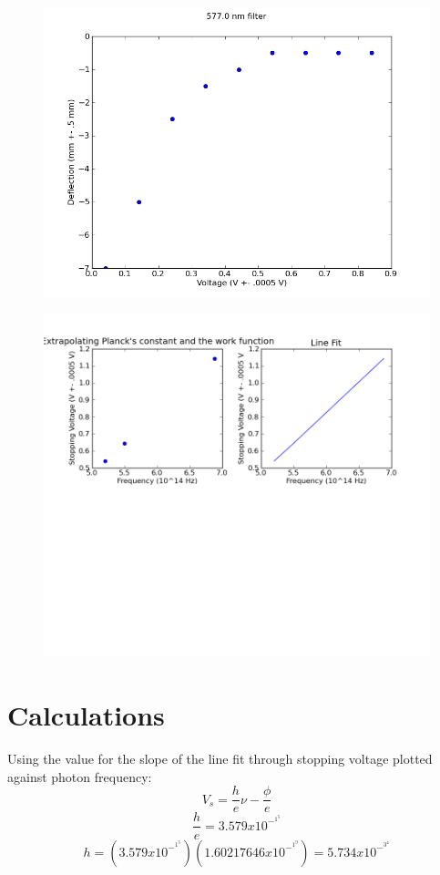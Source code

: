 \documentclass[12pt]{article}
\begin{document}
\begin{figure}[H]
\centering
\hspace{-0.0in}\includegraphics[scale=0.50]{Plot3.png}
\end{figure}

\begin{figure}[H]
\centering
\hspace{-0.0in}\includegraphics[scale=0.71]{Plot4.png}
\end{figure}

\section{Calculations}
\indent \indent Using the value for the slope of the line fit through stopping voltage plotted against photon frequency:
\[ V_s = \frac{h}{e} \nu - \frac{\phi}{e} \]
\[\frac{h}{e} = 3.579 x 10^-^1^5 \]
\[h = (3.579 x 10^-^1^5)(1.60217646 x 10^-^1^9) = 5.734 x 10^-^3^4 \]
\end{document}

